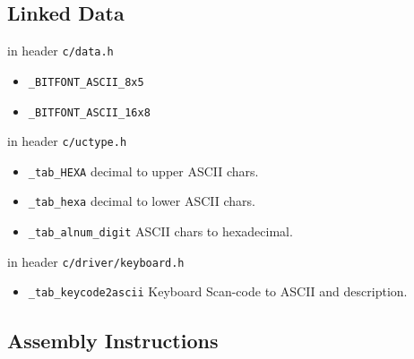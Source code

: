 \subsection{Linked Data}

in header \verb`c/data.h`
\begin{itemize}
	\item \verb `_BITFONT_ASCII_8x5`
	\item \verb `_BITFONT_ASCII_16x8`
\end{itemize}

in header \verb`c/uctype.h`
\begin{itemize}
	\item \verb `_tab_HEXA` decimal to upper ASCII chars.
	\item \verb `_tab_hexa` decimal to lower ASCII chars.
	\item \verb `_tab_alnum_digit` ASCII chars to hexadecimal.
\end{itemize}

in header \verb`c/driver/keyboard.h`
\begin{itemize}
	\item \verb `_tab_keycode2ascii` Keyboard Scan-code to ASCII and description.
\end{itemize}

\subsection{Assembly Instructions}



